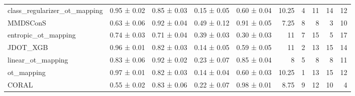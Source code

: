 \begin{tabular}{lllllrrrrr}
 class\_regularizer\_ot\_mapping & 0.95 ± 0.02     & 0.85 ± 0.03       & 0.15 ± 0.05 & 0.60 ± 0.04    &         10.25 &                    4 &                     11 &              14 &                  12 \\
 MMDSConS                     & 0.63 ± 0.06     & 0.92 ± 0.04       & 0.49 ± 0.12 & 0.91 ± 0.05    &          7.25 &                    8 &                      8 &               3 &                  10 \\
 entropic\_ot\_mapping          & 0.74 ± 0.03     & 0.71 ± 0.04       & 0.39 ± 0.03 & 0.30 ± 0.03    &         11    &                    7 &                     15 &               5 &                  17 \\
 JDOT\_XGB                     & 0.96 ± 0.01     & 0.82 ± 0.03       & 0.14 ± 0.05 & 0.59 ± 0.05    &         11    &                    2 &                     13 &              15 &                  14 \\
 linear\_ot\_mapping            & 0.83 ± 0.06     & 0.92 ± 0.02       & 0.23 ± 0.07 & 0.85 ± 0.04    &          8    &                    5 &                      8 &               8 &                  11 \\
 ot\_mapping                   & 0.97 ± 0.01     & 0.82 ± 0.03       & 0.14 ± 0.04 & 0.60 ± 0.03    &         10.25 &                    1 &                     13 &              15 &                  12 \\
 CORAL                        & 0.55 ± 0.02     & 0.83 ± 0.06       & 0.22 ± 0.07 & 0.98 ± 0.01    &          8.75 &                    9 &                     12 &              10 &                   4 \\
\hline
\end{tabular}